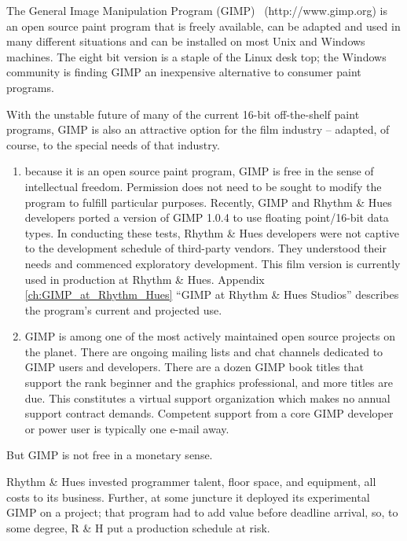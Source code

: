 The General Image Manipulation Program (GIMP) ~(http://www.gimp.org)
is an open source paint program that is freely available, can be
adapted and used in many different situations and can be installed on
most Unix and Windows machines. The eight bit version is a staple of
the Linux desk top; the Windows community is finding GIMP an
inexpensive alternative to consumer paint programs.

With the unstable future of many of the current 16-bit off-the-shelf paint
programs, GIMP is also an attractive option for the film industry -- adapted,
of course, to the special needs of that industry. 

\begin{enumerate}

\item because it is an open source paint program, GIMP is free in the sense of
intellectual freedom. Permission does not need to be sought to modify
the program to fulfill particular purposes. Recently, GIMP and Rhythm
\& Hues developers ported a version of GIMP 1.0.4 to use floating
point/16-bit data types. In conducting these tests, Rhythm \& Hues developers
were not captive to the development schedule of third-party
vendors. They understood their needs and commenced exploratory
development. This film version is currently used
in production at Rhythm \& Hues. Appendix \ref{ch:GIMP_at_Rhythm_Hues} 
``GIMP at Rhythm \& Hues Studios'' describes the program's
current and projected use.

\item GIMP is among one of the most actively maintained open source projects
on the planet. There are ongoing mailing lists and chat channels
dedicated to GIMP users and developers. There are a dozen GIMP book
titles that support the rank beginner and the graphics professional,
and more titles are due. This constitutes a virtual support
organization which makes no annual support contract demands. Competent
support from a core GIMP developer or power user is typically one
e-mail away.

\end{enumerate}

But GIMP is not free in a monetary sense. 

Rhythm \& Hues invested programmer talent, floor space, and equipment,
all costs to its business. Further, at some juncture it deployed its
experimental GIMP on a project; that program had to add value before
deadline arrival, so, to some degree, R \& H put a production schedule
at risk.

